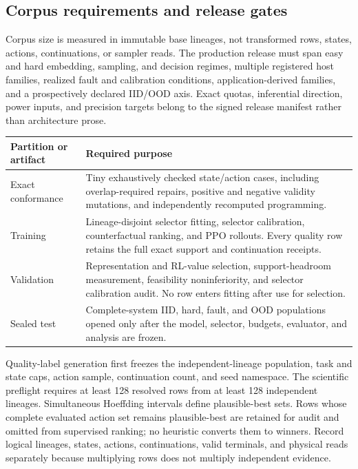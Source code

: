 \subsection{Corpus requirements and release gates}
\label{data:plan}

Corpus size is measured in immutable base lineages, not transformed rows, states, actions, continuations, or sampler reads. The production release must span easy and hard embedding, sampling, and decision regimes, multiple registered host families, realized fault and calibration conditions, application-derived families, and a prospectively declared IID/OOD axis. Exact quotas, inferential direction, power inputs, and precision targets belong to the signed release manifest rather than architecture prose.

{\small
\begin{longtable}{@{}p{}p{}@{}}
\toprule
Partition or artifact & Required purpose \\
\midrule
\endhead
Exact conformance & Tiny exhaustively checked state/action cases, including overlap-required repairs, positive and negative validity mutations, and independently recomputed programming. \\
Training & Lineage-disjoint selector fitting, selector calibration, counterfactual ranking, and PPO rollouts. Every quality row retains the full exact support and continuation receipts. \\
Validation & Representation and RL-value selection, support-headroom measurement, feasibility noninferiority, and selector calibration audit. No row enters fitting after use for selection. \\
Sealed test & Complete-system IID, hard, fault, and OOD populations opened only after the model, selector, budgets, evaluator, and analysis are frozen. \\
\bottomrule
\end{longtable}}

Quality-label generation first freezes the independent-lineage population, task and state caps, action sample, continuation count, and seed namespace. The scientific preflight requires at least 128 resolved rows from at least 128 independent lineages. Simultaneous Hoeffding intervals define plausible-best sets. Rows whose complete evaluated action set remains plausible-best are retained for audit and omitted from supervised ranking; no heuristic converts them to winners. Record logical lineages, states, actions, continuations, valid terminals, and physical reads separately because multiplying rows does not multiply independent evidence.


